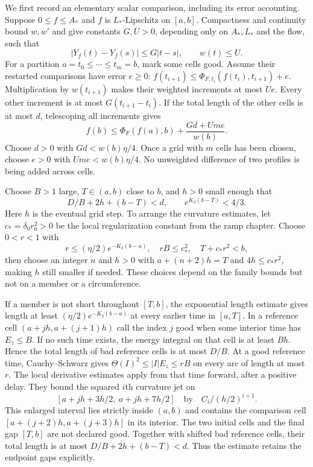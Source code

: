 We first record an elementary scalar comparison, including its error
accounting.  Suppose $0\le f\le A_*$ and $f$ is $L_*$-Lipschitz on
$[a,b]$.  Compactness and continuity bound $w,w'$ and give constants
$G,U>0$, depending only on $A_*,L_*$ and the flow, such that
\[
 |Y_f(t)-Y_f(s)|\le G|t-s|,\qquad w(t)\le U.
\]
For a partition $a=t_0\le\cdots\le t_m=b$, mark some cells good.
Assume their restarted comparisons have error $e\ge0$:
$f(t_{i+1})\le\Phi_{F,t_i}(f(t_i),t_{i+1})+e$.
Multiplication by $w(t_{i+1})$ makes their weighted increments at most
$Ue$.  Every other increment is at most $G(t_{i+1}-t_i)$.
If the total length of the other cells is at most $d$, telescoping all
increments gives
\[
 f(b)\le\Phi_F(f(a),b)+\frac{Gd+Ume}{w(b)}.
\]
Choose $d>0$ with $Gd<w(b)\eta/4$.  Once a grid with $m$ cells has
been chosen, choose $e>0$ with $Ume<w(b)\eta/4$.
No unweighted difference of two profiles is being added across cells.

Choose $B>1$ large, $T\in(a,b)$ close to $b$, and $h>0$ small enough
that
\[
 D/B+2h+(b-T)<d,\qquad e^{K_2(b-T)}<4/3.
\]
Here $h$ is the eventual grid step.  To arrange the curvature estimates,
let $c_*=\delta_0r_0^2>0$ be the local regularization constant from the
ramp chapter.  Choose $0<r<1$ with
\[
 r\le(\eta/2)e^{-K_2(b-a)},\quad rB\le c_*^2,\quad T+c_*r^2<b,
\]
then choose an integer $n$ and $h>0$ with
$a+(n+2)h=T$ and $4h\le c_*r^2$, making $h$ still smaller if needed.
These choices depend on the family bounds but not on a member or a
circumference.

If a member is not short throughout $[T,b]$, the exponential length
estimate gives length at least $(\eta/2)e^{-K_2(b-a)}$ at every earlier
time in $[a,T]$.  In a reference cell $(a+jh,a+(j+1)h)$ call the index
$j$ good when some interior time has $E_z\le B$.  If no such time exists,
the energy integral on that cell is at least $Bh$.  Hence the total length
of bad reference cells is at most $D/B$.
At a good reference time, Cauchy--Schwarz gives
$\Theta(I)^2\le |I|E_z\le rB$ on every arc of length at most $r$.
The local derivative estimates apply from that time forward, after a
positive delay.  They bound the squared $i$th curvature jet on
\[
 [a+jh+3h/2,\ a+jh+7h/2]
 \quad\text{by}\quad C_i/(h/2)^{i+1}.
\]
This enlarged interval lies strictly inside $(a,b)$ and contains the
comparison cell $[a+(j+2)h,a+(j+3)h]$ in its interior.  The two initial
cells and the final gap $[T,b]$ are not declared good.  Together with
shifted bad reference cells, their total length is at most
$D/B+2h+(b-T)<d$.  Thus the estimate retains the endpoint gaps explicitly.

